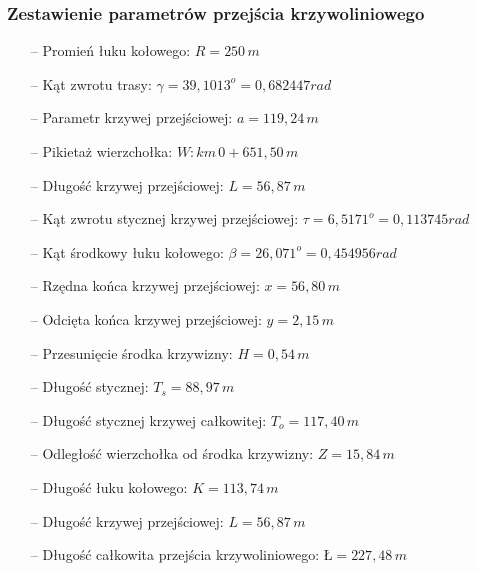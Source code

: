 \documentclass[12pt]{article}
\begin{document}
            \subsubsection{Zestawienie parametrów przejścia krzywoliniowego}
                \begin{itemize}
                    \item[--] Promień łuku kołowego: \( R = 250\,m \)
                    \item[--] Kąt zwrotu trasy: \( \gamma = 39,1013^{o} = 0,682447rad\)
                    \item[--] Parametr krzywej przejściowej: \( a = 119,24\,m \)
                    \item[--] Pikietaż wierzchołka: \( W:km\,0 + 651,50\,m \)
                    \item[--] Długość krzywej przejściowej: \( L = 56,87\,m \)
                    \item[--] Kąt zwrotu stycznej krzywej przejściowej: \( \tau = 6,5171^{o} = 0,113745rad \)
                    \item[--] Kąt środkowy łuku kołowego: \( \beta = 26,071^{o} = 0,454956rad \)
                    \item[--] Rzędna końca krzywej przejściowej: \( x = 56,80\,m \)
                    \item[--] Odcięta końca krzywej przejściowej: \( y = 2,15\,m \)
                    \item[--] Przesunięcie środka krzywizny: \( H = 0,54\,m \)
                    \item[--] Długość stycznej: \( T_{s} = 88,97\,m \)
                    \item[--] Długość stycznej krzywej całkowitej: \( T_{o} = 117,40\,m \)
                    \item[--] Odległość wierzchołka od środka krzywizny: \( Z = 15,84\,m \)
                    \item[--] Długość łuku kołowego: \( K = 113,74\,m \)
                    \item[--] Długość krzywej przejściowej: \( L = 56,87\,m\)
                    \item[--] Długość całkowita przejścia krzywoliniowego: \( \mbox{Ł} = 227,48\,m \)           
                \end{itemize}
\end{document}
